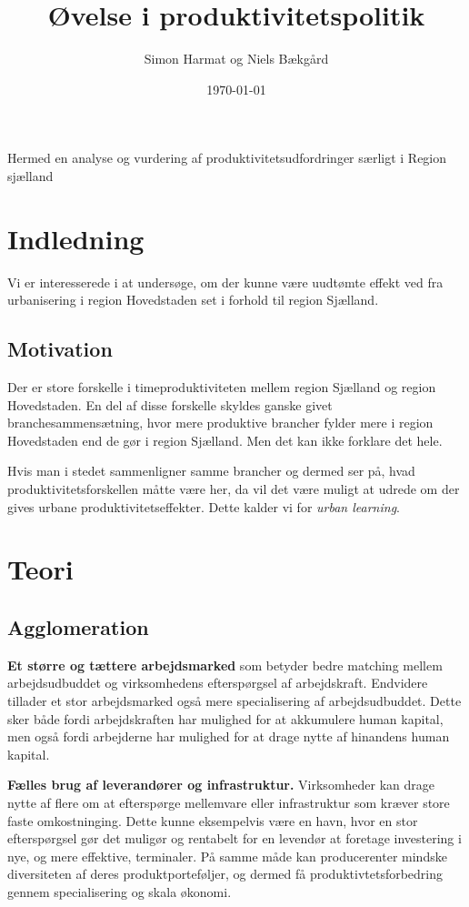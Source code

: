 \documentclass[a4paper, 12pt, titlepage]{article}
\author{Simon Harmat og Niels Bækgård}
\title{Øvelse i produktivitetspolitik}
\date{\today}
\begin{document}

Hermed en analyse og vurdering af produktivitetsudfordringer særligt i Region sjælland

\section{Indledning}
Vi er interesserede i at undersøge, om der kunne være uudtømte effekt ved fra urbanisering i region Hovedstaden set i forhold til region Sjælland. 
\subsection{Motivation}
Der er store forskelle i timeproduktiviteten mellem region Sjælland og region Hovedstaden. En del af disse forskelle skyldes ganske givet branchesammensætning, hvor mere produktive brancher fylder mere i region Hovedstaden end de gør i region Sjælland. Men det kan ikke forklare det hele.

Hvis man i stedet sammenligner samme brancher og dermed ser på, hvad produktivitetsforskellen måtte være her, da vil det være muligt at udrede om der gives urbane produktivitetseffekter. Dette kalder vi for \emph{urban learning}.
\section{Teori}
\subsection{Agglomeration}

\textbf{Et større og tættere arbejdsmarked} som betyder bedre matching mellem arbejdsudbuddet og virksomhedens efterspørgsel af arbejdskraft. Endvidere tillader et stor arbejdsmarked også mere specialisering af arbejdsudbuddet. Dette sker både fordi arbejdskraften har mulighed for at akkumulere human kapital, men også fordi arbejderne har mulighed for at drage nytte af hinandens human kapital.  

\textbf{Fælles brug af leverandører og infrastruktur.} Virksomheder kan drage nytte af flere om at efterspørge mellemvare eller infrastruktur som kræver store faste omkostninging. Dette kunne eksempelvis være en havn, hvor en stor efterspørgsel gør det muligør og rentabelt for en levendør  at foretage investering i nye, og mere effektive, terminaler. På samme måde kan producerenter mindske diversiteten af deres produktporteføljer, og dermed få produktivtetsforbedring gennem specialisering og skala økonomi.    
\end{document}

